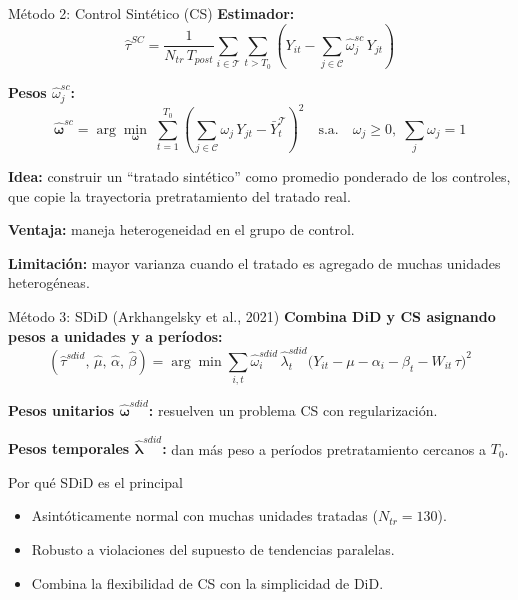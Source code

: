 \documentclass[10pt,aspectratio=169]{beamer}
\begin{document}
\begin{frame}{Método 2: Control Sintético (CS)}
\textbf{Estimador:}
\[
\hat{\tau}^{SC} = \frac{1}{N_{tr}\,T_{post}} \sum_{i \in \mathcal{T}}\sum_{t > T_0} \left(Y_{it} - \sum_{j \in \mathcal{C}} \hat{\omega}_j^{sc}\,Y_{jt}\right)
\]

\textbf{Pesos $\hat{\omega}_j^{sc}$:}
\[
\hat{\boldsymbol{\omega}}^{sc} = \arg\min_{\boldsymbol{\omega}}\;\sum_{t=1}^{T_0} \left(\sum_{j \in \mathcal{C}} \omega_j\,Y_{jt} - \bar{Y}_t^{\mathcal{T}}\right)^{\!2}
\quad \text{s.a.} \quad \omega_j \geq 0,\; \sum_j \omega_j = 1
\]

\vspace{0.5em}
\textbf{Idea:} construir un ``tratado sintético'' como promedio ponderado de los controles, que copie la trayectoria pretratamiento del tratado real.

\textbf{Ventaja:} maneja heterogeneidad en el grupo de control.

\textbf{Limitación:} mayor varianza cuando el tratado es agregado de muchas unidades heterogéneas.
\end{frame}

\begin{frame}{Método 3: SDiD (Arkhangelsky et al., 2021)}
\textbf{Combina DiD y CS asignando pesos a unidades \textbf{y} a períodos:}
\[
(\hat{\tau}^{sdid},\,\hat{\mu},\,\hat{\alpha},\,\hat{\beta}) = \arg\min \sum_{i,t} \hat{\omega}_i^{sdid}\,\hat{\lambda}_t^{sdid} \bigl(Y_{it} - \mu - \alpha_i - \beta_t - W_{it}\,\tau\bigr)^2
\]

\textbf{Pesos unitarios $\hat{\boldsymbol{\omega}}^{sdid}$:} resuelven un problema CS con regularización.

\textbf{Pesos temporales $\hat{\boldsymbol{\lambda}}^{sdid}$:} dan más peso a períodos pretratamiento cercanos a $T_0$.

\vspace{0.5em}
\begin{block}{Por qué SDiD es el principal}
\begin{itemize}
  \item Asintóticamente normal con muchas unidades tratadas ($N_{tr} = 130$).
  \item Robusto a violaciones del supuesto de tendencias paralelas.
  \item Combina la flexibilidad de CS con la simplicidad de DiD.
\end{itemize}
\end{block}
\end{frame}
\end{document}
